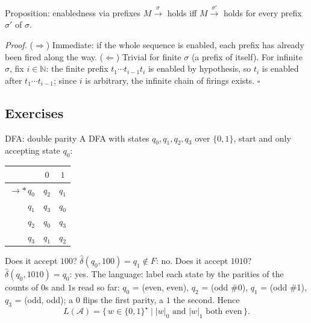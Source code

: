\begin{definitionbox}{Proposition: enabledness via prefixes}
$M \xrightarrow{\sigma}$ holds iff $M \xrightarrow{\sigma'}$ holds for every prefix $\sigma'$ of $\sigma$.
\par\smallskip
\textit{Proof.} ($\Rightarrow$) Immediate: if the whole sequence is enabled, each prefix has already been fired along the way. ($\Leftarrow$) Trivial for finite $\sigma$ (a prefix of itself). For infinite $\sigma$, fix $i \in \mathbb{N}$: the finite prefix $t_1 \cdots t_{i-1} t_i$ is enabled by hypothesis, so $t_i$ is enabled after $t_1 \cdots t_{i-1}$; since $i$ is arbitrary, the infinite chain of firings exists. \hfill$\square$
\end{definitionbox}

\subsection{Exercises}

\begin{examplebox}{DFA: double parity}
A DFA with states $q_0, q_1, q_2, q_3$ over $\{0, 1\}$, start and only accepting state $q_0$:
\begin{center}
\renewcommand{\arraystretch}{1.1}
\begin{tabular}{r|cc}
 & $0$ & $1$ \\
\hline
$\to \ast\, q_0$ & $q_2$ & $q_1$ \\
$q_1$ & $q_3$ & $q_0$ \\
$q_2$ & $q_0$ & $q_3$ \\
$q_3$ & $q_1$ & $q_2$ \\
\end{tabular}
\end{center}
Does it accept $100$? $\hat{\delta}(q_0, 100) = q_1 \notin F$: no. Does it accept $1010$? $\hat{\delta}(q_0, 1010) = q_0$: yes. The language: label each state by the parities of the counts of $0$s and $1$s read so far: $q_0$ = (even, even), $q_2$ = (odd \#0), $q_1$ = (odd \#1), $q_3$ = (odd, odd); a $0$ flips the first parity, a $1$ the second. Hence
\[
  L(\mathcal{A}) = \{\, w \in \{0,1\}^\star \mid |w|_0 \text{ and } |w|_1 \text{ both even} \,\}.
\]
\end{examplebox}

